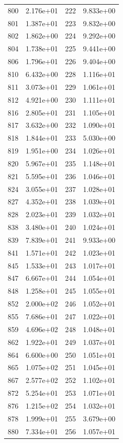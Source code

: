 \documentclass[12pt]{article}
\begin{document}
\begin{longtable}{@{}cccc@{}}
800 & 2.176e+01 & 222 & 9.833e+00 \\
801 & 1.387e+01 & 223 & 9.832e+00 \\
802 & 1.862e+00 & 224 & 9.292e+00 \\
804 & 1.738e+01 & 225 & 9.441e+00 \\
806 & 1.796e+01 & 226 & 9.404e+00 \\
810 & 6.432e+00 & 228 & 1.116e+01 \\
811 & 3.073e+01 & 229 & 1.061e+01 \\
812 & 4.921e+00 & 230 & 1.111e+01 \\
816 & 2.805e+01 & 231 & 1.105e+01 \\
817 & 3.632e+00 & 232 & 1.090e+01 \\
818 & 1.844e+01 & 233 & 5.030e+00 \\
819 & 1.951e+00 & 234 & 1.026e+01 \\
820 & 5.967e+01 & 235 & 1.148e+01 \\
821 & 5.595e+01 & 236 & 1.046e+01 \\
824 & 3.055e+01 & 237 & 1.028e+01 \\
827 & 4.352e+01 & 238 & 1.039e+01 \\
828 & 2.023e+01 & 239 & 1.032e+01 \\
838 & 3.480e+01 & 240 & 1.024e+01 \\
839 & 7.839e+01 & 241 & 9.933e+00 \\
841 & 1.571e+01 & 242 & 1.023e+01 \\
845 & 1.533e+01 & 243 & 1.017e+01 \\
847 & 6.667e+01 & 244 & 1.054e+01 \\
848 & 1.258e+01 & 245 & 1.055e+01 \\
852 & 2.000e+02 & 246 & 1.052e+01 \\
855 & 7.686e+01 & 247 & 1.022e+01 \\
859 & 4.696e+02 & 248 & 1.048e+01 \\
862 & 1.922e+01 & 249 & 1.037e+01 \\
864 & 6.600e+00 & 250 & 1.051e+01 \\
865 & 1.075e+02 & 251 & 1.045e+01 \\
867 & 2.577e+02 & 252 & 1.102e+01 \\
872 & 5.254e+01 & 253 & 1.071e+01 \\
876 & 1.215e+02 & 254 & 1.032e+01 \\
878 & 1.999e+01 & 255 & 3.679e+00 \\
880 & 7.334e+01 & 256 & 1.057e+01 \\

\end{longtable}
\end{document}
